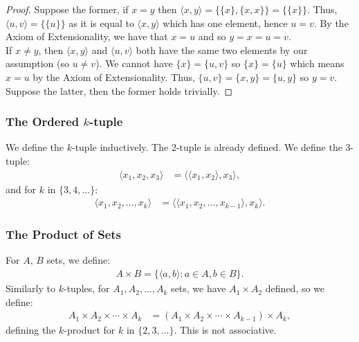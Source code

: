 \begin{proof}
    Suppose the former, if $x = y$ then 
    $\langle x, y \rangle = \{\{x\}, \{x, x\}\} = \{\{x\}\}$.
    Thus, $\langle u, v \rangle = \{\{u\}\}$ as it is equal to
    $\langle x, y \rangle$ which has one element, hence $u = v$. 
    By the Axiom of Extensionality, we have that $x = u$ and so
    $y = x = u = v$.
    \\[\baselineskip]
    If $x \neq y$, then $\langle x, y \rangle$ and $\langle u, v \rangle$
    both have the same two elements by our assumption (so $u \neq v$).
    We cannot have $\{x\} = \{u, v\}$ so $\{x\} = \{u\}$ which means
    $x = u$ by the Axiom of Extensionality. Thus, 
    $\{u, v\} = \{x, y\} = \{u, y\}$ so $y = v$.
    \\[\baselineskip]
    Suppose the latter, then the former holds trivially.
\end{proof}

\subsubsection{The Ordered $k$-tuple}

We define the $k$-tuple inductively. The $2$-tuple is already defined.
We define the $3$-tuple: \begin{align*}
    \langle x_1, x_2, x_3 \rangle &= \langle \langle x_1, x_2 \rangle, x_3 \rangle,
\end{align*} and for $k$ in $\{3, 4, \ldots\}$: \begin{align*}
    \langle x_1, x_2, \ldots, x_k \rangle &= \langle \langle x_1, x_2, \ldots, x_{k - 1} \rangle, x_k \rangle.
\end{align*}

\subsubsection{The Product of Sets}

For $A$, $B$ sets, we define: \begin{align*}
    A \times B = \{\langle a, b \rangle : a \in A, b \in B\}.
\end{align*} Similarly to $k$-tuples, for $A_1, A_2, \ldots, A_k$ sets,
we have $A_1 \times A_2$ defined, so we define: \begin{align*}
    A_1 \times A_2 \times \cdots \times A_k 
    &= (A_1 \times A_2 \times \cdots \times A_{k - 1}) \times A_k,
\end{align*} defining the $k$-product for $k$ in $\{2, 3, \ldots\}$.
This is not associative.

